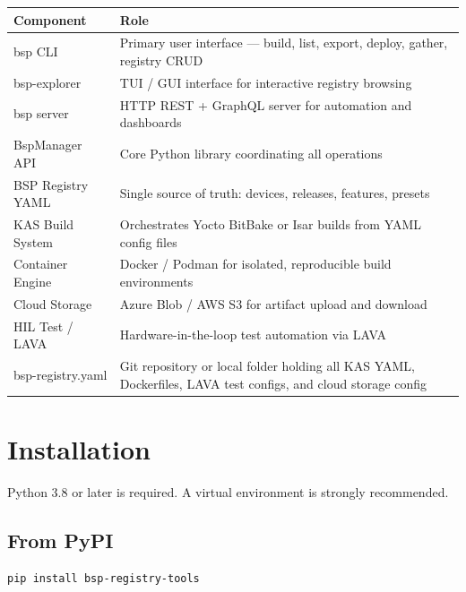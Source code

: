 \documentclass[a4paper,11pt]{article}
\begin{document}
\begin{tabularx}{\linewidth}{L{50mm}X}
  \textbf{Component} & \textbf{Role} \\
  \toprule
   bsp CLI
    & Primary user interface --- build, list, export, deploy, gather, registry CRUD \\
    bsp-explorer
    & TUI / GUI interface for interactive registry browsing \\
   bsp server
    & HTTP REST + GraphQL server for automation and dashboards \\
    BspManager API
    & Core Python library coordinating all operations \\
   BSP Registry YAML
    & Single source of truth: devices, releases, features, presets \\
    KAS Build System
    & Orchestrates Yocto BitBake or Isar builds from YAML config files \\
   Container Engine
    & Docker / Podman for isolated, reproducible build environments \\
    Cloud Storage
    & Azure Blob / AWS S3 for artifact upload and download \\
   HIL Test / LAVA
    & Hardware-in-the-loop test automation via LAVA \\
    bsp-registry.yaml
    & Git repository or local folder holding all KAS YAML, Dockerfiles,
      LAVA test configs, and cloud storage config \\
  \bottomrule
\end{tabularx}

\section{Installation}

Python 3.8 or later is required. A virtual environment is strongly recommended.

\subsection{From PyPI}

\begin{lstlisting}[language=Bash]
pip install bsp-registry-tools
\end{lstlisting}
\end{document}
